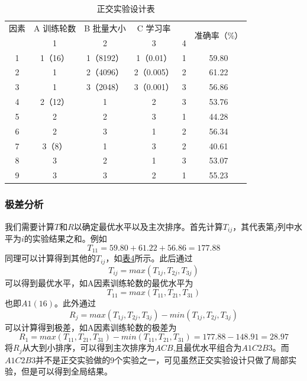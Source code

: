 \documentclass[UTF8]{ctexart}
\begin{document}
	\begin{table}[htbp]
		\centering
		\caption{正交实验设计表}
		\begin{tabular}{|c|c|c|c|c|c|}
			\hline
			因素 & A 训练轮数 & B 批量大小 & C 学习率 &   & \multirow{2}[4]{*}{准确率（\%）} \\
			\cline{1-5} \diagbox{实验号}{列号} & 1 & 2 & 3 & 4 &  \\\hline
			1 & 1（16） & 1（8192） & 1（0.01） & 1 & 59.80 \\\hline
			2 & 1 & 2（4096） & 2（0.005） & 2 & 61.22 \\\hline
			3 & 1 & 3（2048） & 3（0.001） & 3 & 56.86 \\\hline
			4 & 2（12） & 1 & 2 & 3 & 53.76 \\\hline
			5 & 2 & 2 & 3 & 1 & 44.28 \\\hline
			6 & 2 & 3 & 1 & 2 & 56.34 \\\hline
			7 & 3（8） & 1 & 3 & 2 & 40.61 \\\hline
			8 & 3 & 2 & 1 & 3 & 53.07 \\\hline
			9 & 3 & 3 & 2 & 1 & 55.23 \\\hline
		\end{tabular}%
		\label{Chart.3}%
	\end{table}%

	\subsubsection{极差分析}
	我们需要计算$T$和$R$以确定最优水平以及主次排序。首先计算$T_{ij}$，其代表第$j$列中水平为$i$的实验结果之和。例如
	\begin{equation*}
	T_{11} = 59.80+61.22+56.86 = 177.88
	\end{equation*}
	同理可以计算得到其他的$T_{ij}$，如\hyperref[Chart.4]{表4}所示。此后通过
	\begin{equation*}
	T_{ij} = max(T_{1j}, T_{2j}, T_{3j})
	\end{equation*}
	可以得到最优水平，如A因素训练轮数的最优水平为
	\begin{equation*}
	T_{11} = max(T_{11}, T_{21}, T_{31})
	\end{equation*}
	也即$A1(16)$。此外通过
	\begin{equation*}
	R_j= max(T_{1j}, T_{2j}, T_{3j}) - min(T_{1j}, T_{2j}, T_{3j})
	\end{equation*}
	可以计算得到极差，如A因素训练轮数的极差为
	\begin{equation*}
	R_1= max(T_{11}, T_{21}, T_{31}) - min(T_{11}, T_{21}, T_{31}) = 177.88 - 148.91 = 28.97
	\end{equation*}
	将$R_j$从大到小排序，可以得到主次排序为$ACB$,且最优水平组合为$A1C2B3$。而$A1C2B3$并不是正交实验做的9个实验之一，可见虽然正交实验设计只做了局部实验，但是可以得到全局结果。
	
\end{document}
